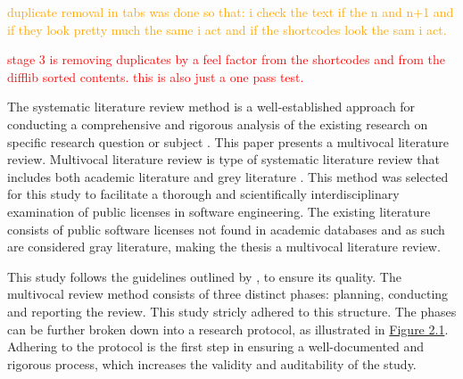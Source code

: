 \textcolor{orange}{duplicate removal in tabs was done so that: i check the text if the n and n+1 and if they look pretty much the same i act and if the shortcodes look the sam i act.}

\textcolor{red}{stage 3 is removing duplicates by a feel factor from the shortcodes and from the difflib sorted contents. this is also just a one pass test.}

The systematic literature review method is a well-established approach for conducting a comprehensive and rigorous analysis of the existing research on specific research question or subject \citep{kitchenham2007}. This paper presents a multivocal literature review. Multivocal literature review is type of systematic literature review that includes both academic literature and grey literature \citep{mantyla2019}. This method was selected for this study to facilitate a thorough and scientifically interdisciplinary examination of public licenses in software engineering. The existing literature consists of public software licenses not found in academic databases and as such are considered gray literature, making the thesis a multivocal literature review.

This study follows the guidelines outlined by \cite{kitchenham2007}, to ensure its quality. The multivocal review method consists of three distinct phases: planning, conducting and reporting the review. This study stricly adhered to this structure. The phases can be further broken down into a research protocol, as illustrated in \hyperref[fig:slrphases]{Figure 2.1}. Adhering to the protocol is the first step in ensuring a well-documented and rigorous process, which increases the validity and auditability of the study.

